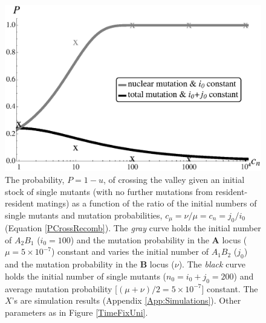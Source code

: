 \documentclass[review,3p,authoryear]{elsarticle}
\begin{document}
\begin{figure}[t]
\centering
\includegraphics[width=\linewidth]{IMAGES/ProbFixUniS2Sims.eps}
\caption{
The probability, $P=1-u$, of crossing the valley given an initial stock of single mutants (with no further mutations from resident-resident matings) as a function of the ratio of the initial numbers of single mutants and mutation probabilities, $c_\mu=\nu/\mu=c_n=j_0/i_0$ (Equation \ref{PCrossRecomb}).
The \textit{gray} curve holds the initial number of $A_2B_1$ ($i_0=100$) and the mutation probability in the $\mathbf{A}$ locus ($\mu=5\times10^{-7}$) constant and varies the initial number of $A_1B_2$ ($j_0$) and the mutation probability in the $\mathbf{B}$ locus ($\nu$).
The \textit{black} curve holds the initial number of single mutants ($n_0=i_0+j_0=200$) and average mutation probability [$(\mu+\nu)/2 = 5\times10^{-7}$] constant.
The $X$'s are simulation results (Appendix \ref{App:Simulations}).
Other parameters as in Figure \ref{TimeFixUni}. 
}
\label{ProbFixUni}
\end{figure}
\end{document}
